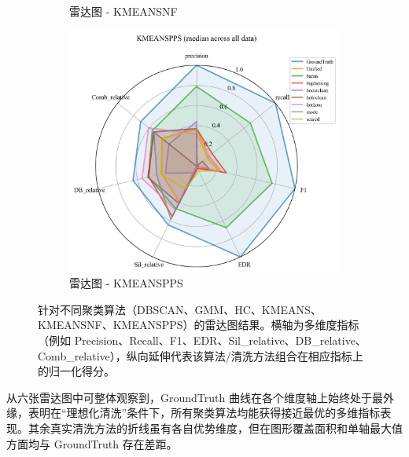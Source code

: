 \documentclass[10pt]{article} %
\numberwithin{equation}{section}
\begin{document}
\begin{enumerate}[label=(\alph*)]
\begin{figure}[htbp]
\begin{subfigure}[b]{0.30\linewidth}
        \caption{雷达图 - KMEANSNF}
        \label{fig:radar_kmeansnf}
    \end{subfigure}
    \hfill
    \begin{subfigure}[b]{0.30\linewidth}
        \centering
        \includegraphics[width=\linewidth]{figures/radar graph/radar_KMEANSPPS.png}
        \caption{雷达图 - KMEANSPPS}
        \label{fig:radar_kmeanspps}
    \end{subfigure}

    \caption{针对不同聚类算法（DBSCAN、GMM、HC、KMEANS、KMEANSNF、KMEANSPPS）的雷达图结果。横轴为多维度指标（例如 Precision、Recall、F1、EDR、Sil\_relative、DB\_relative、Comb\_relative），纵向延伸代表该算法/清洗方法组合在相应指标上的归一化得分。}
    \label{fig:all_radar_charts}
\end{figure}

从六张雷达图中可整体观察到，GroundTruth 曲线在各个维度轴上始终处于最外缘，表明在“理想化清洗”条件下，所有聚类算法均能获得接近最优的多维指标表现。其余真实清洗方法的折线虽有各自优势维度，但在图形覆盖面积和单轴最大值方面均与 GroundTruth 存在差距。


\end{enumerate}
\end{document}
